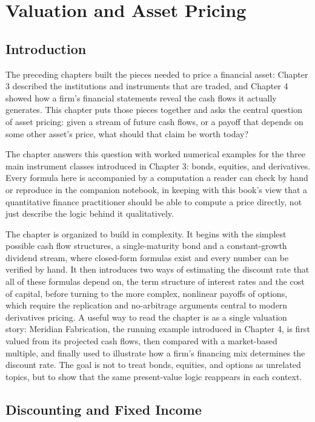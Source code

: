 \documentclass[../ai_in_finance]{subfiles}
\begin{document}
\chapter{Valuation and Asset Pricing}

\section{Introduction}

The preceding chapters built the pieces needed to price a financial asset: Chapter 3 described the institutions and instruments that are traded, and Chapter 4 showed how a firm's financial statements reveal the cash flows it actually generates. This chapter puts those pieces together and asks the central question of asset pricing: given a stream of future cash flows, or a payoff that depends on some other asset's price, what should that claim be worth today?

The chapter answers this question with worked numerical examples for the three main instrument classes introduced in Chapter 3: bonds, equities, and derivatives. Every formula here is accompanied by a computation a reader can check by hand or reproduce in the companion notebook, in keeping with this book's view that a quantitative finance practitioner should be able to compute a price directly, not just describe the logic behind it qualitatively.

The chapter is organized to build in complexity. It begins with the simplest possible cash flow structures, a single-maturity bond and a constant-growth dividend stream, where closed-form formulas exist and every number can be verified by hand.
It then introduces two ways of estimating the discount rate that all of these formulas depend on, the term structure of interest rates and the cost of capital, before turning to the more complex, nonlinear payoffs of options, which require the replication and no-arbitrage arguments central to modern derivatives pricing. A useful way to read the chapter is as a single valuation story: Meridian Fabrication, the running example introduced in Chapter 4, is first valued from its projected cash flows, then compared with a market-based multiple, and finally used to illustrate how a firm's financing mix determines the discount rate. The goal is not to treat bonds, equities, and options as unrelated topics, but to show that the same present-value logic reappears in each context.

\section{Discounting and Fixed Income}
\end{document}
